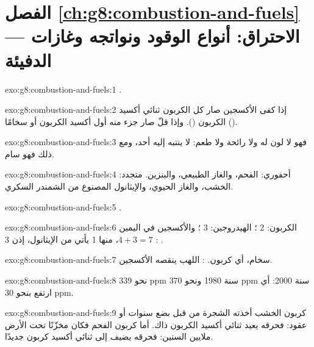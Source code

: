 \section*{الفصل \ref{ch:g8:combustion-and-fuels} --- الاحتراق: أنواع الوقود ونواتجه وغازات الدفيئة}

\begin{solution}{exo:g8:combustion-and-fuels:1}
.
\end{solution}

\begin{solution}{exo:g8:combustion-and-fuels:2}
إذا كفى الأكسجين صار كل الكربون ثنائي أكسيد الكربون (). وإذا
قلّ صار جزء منه أول أكسيد الكربون أو سخامًا ().
\end{solution}

\begin{solution}{exo:g8:combustion-and-fuels:3}
فهو لا لون له ولا رائحة ولا طعم: لا ينتبه إليه أحد، ومع ذلك فهو
سام.
\end{solution}

\begin{solution}{exo:g8:combustion-and-fuels:4}
أحفوري: الفحم، والغاز الطبيعي، والبنزين. متجدد: الخشب، والغاز الحيوي،
والإيثانول المصنوع من الشمندر السكري.
\end{solution}

\begin{solution}{exo:g8:combustion-and-fuels:5}
.
\end{solution}

\begin{solution}{exo:g8:combustion-and-fuels:6}
الكربون: 2 ؛ الهيدروجين: 3 ؛ والأكسجين في اليمين $4 + 3 =
7$، منها 1 يأتي من الإيثانول، إذن 3 :
.
\end{solution}

\begin{solution}{exo:g8:combustion-and-fuels:7}
سخام، أي كربون. : اللهب ينقصه
الأكسجين.
\end{solution}

\begin{solution}{exo:g8:combustion-and-fuels:8}
نحو 339 ppm سنة 1980 ونحو 370 ppm سنة 2000: أي ارتفع بنحو 30 ppm.
\end{solution}

\begin{solution}{exo:g8:combustion-and-fuels:9}
كربون الخشب أخذته الشجرة من  قبل بضع سنوات أو عقود: فحرقه يعيد ثنائي
أكسيد الكربون ذاك. أما كربون الفحم فكان مخزّنًا تحت الأرض ملايين السنين:
فحرقه يضيف إلى  ثنائي أكسيد كربون
جديدًا.
\end{solution}

